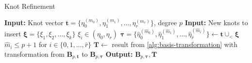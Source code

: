\begin{algorithm}
    \caption{Knot Refinement}\label{alg:knot-refinement}
    \begin{algorithmic}[1]
        \State \textbf{Input:} Knot vector $\mathbf t = \{\eta_0^{(m_0)}, \eta_1^{(m_1)}, \dots, \eta_r^{(m_r)}\}$, degree $p$
        \State \textbf{Input:} New knots to insert $\boldsymbol \xi = \{\xi_1, \xi_2, \dots, \xi_k\}$
        \Ensure $\xi_i \in (\eta_0, \eta_r)$
        \State $\boldsymbol \tau = \{\hat\eta_0^{(\hat m_0)}, \hat\eta_1^{(\hat m_1)}, \dots, \hat\eta_{\hat r}^{(\hat m_{\hat r})}\} \gets \mathbf t \cup_< \boldsymbol \xi$ 
        \Ensure $\hat m_i \leq p+1$ for $i \in \{0,1,\ldots,\hat r\}$
        \State $\mathbf T \gets $ result from \cref{alg:basis-transformation} with transformation from $\mathbf B_{p,\mathbf t}$ to $\mathbf B_{p,\boldsymbol \tau}$
        \State \textbf{Output:} $\mathbf B_{p, \boldsymbol \tau}, \mathbf T$
    \end{algorithmic}
\end{algorithm}

